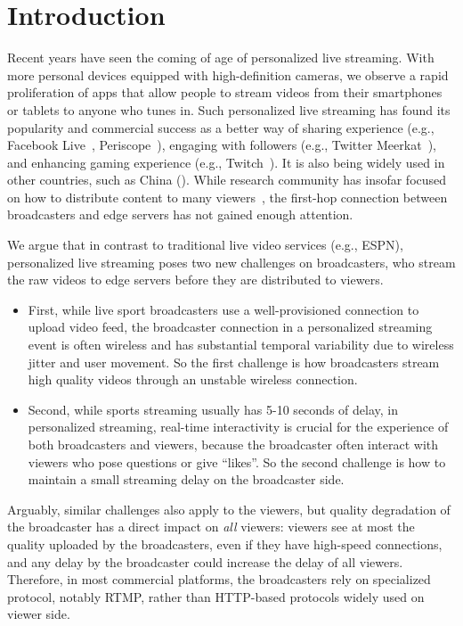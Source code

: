 \section{Introduction}


Recent years have seen the coming of age of personalized live streaming. 
With more personal devices equipped with high-definition cameras, we observe a rapid proliferation of apps that allow people to stream videos from their smartphones or tablets to anyone who tunes in. 
Such personalized live streaming has found its popularity and commercial success as a better way of sharing experience (e.g., Facebook Live~\cite{??}, Periscope~\cite{??}), engaging with followers (e.g., Twitter Meerkat~\cite{??}), and enhancing gaming experience (e.g., Twitch~\cite{??}).
It is also being widely used in other countries, such as China (\cite{qixiu,douyu,??}).
While research community has insofar focused on how to distribute content to many viewers~\cite{??,??,??}, the first-hop connection between broadcasters and edge servers has not gained enough attention.

We argue that in contrast to traditional live video services (e.g., ESPN), personalized live streaming poses two new challenges on broadcasters, who stream the raw videos to edge servers before they are distributed to viewers.
\begin{itemize}

\item First, while live sport broadcasters use a well-provisioned connection to upload video feed, the broadcaster connection in a personalized streaming event is often wireless and has substantial temporal variability due to wireless jitter and user movement. 
So the first challenge is how broadcasters stream high quality videos through an unstable wireless connection.

\item Second, while sports streaming usually has 5-10 seconds of delay, in personalized streaming, real-time interactivity is crucial for the experience of both broadcasters and viewers, because the broadcaster often interact with viewers who pose questions or give ``likes''.
So the second challenge is how to maintain a small streaming delay on the broadcaster side.
\end{itemize}
Arguably, similar challenges also apply to the viewers, but quality degradation of the broadcaster has a direct impact on {\em all} viewers: viewers see at most the quality uploaded by the broadcasters, even if they have high-speed connections, and any delay by the broadcaster could increase the delay of all viewers.
Therefore, in most commercial platforms, the broadcasters rely on specialized protocol, notably RTMP, rather than HTTP-based protocols widely used on viewer side.

